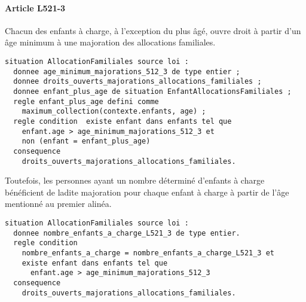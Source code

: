 \documentclass[11pt, french]{article}
\begin{document}
\paragraph{Article L521-3} Chacun des enfants à charge, à l'exception du plus âgé, ouvre droit à partir d'un âge minimum à une majoration des allocations familiales.
\begin{lstlisting}
situation AllocationFamiliales source loi :
  donnee age_minimum_majorations_512_3 de type entier ;
  donnee droits_ouverts_majorations_allocations_familiales ;
  donnee enfant_plus_age de situation EnfantAllocationsFamiliales ;
  regle enfant_plus_age defini comme
    maximum_collection(contexte.enfants, age) ;
  regle condition  existe enfant dans enfants tel que
    enfant.age > age_minimum_majorations_512_3 et
    non (enfant = enfant_plus_age)
  consequence
    droits_ouverts_majorations_allocations_familiales.
\end{lstlisting}

Toutefois, les personnes ayant un nombre déterminé d'enfants à charge bénéficient de ladite majoration pour chaque enfant à charge à partir de l'âge mentionné au premier alinéa.
\begin{lstlisting}
situation AllocationFamiliales source loi :
  donnee nombre_enfants_a_charge_L521_3 de type entier.
  regle condition
    nombre_enfants_a_charge = nombre_enfants_a_charge_L521_3 et
    existe enfant dans enfants tel que
      enfant.age > age_minimum_majorations_512_3
  consequence
    droits_ouverts_majorations_allocations_familiales.
\end{lstlisting}
\end{document}
